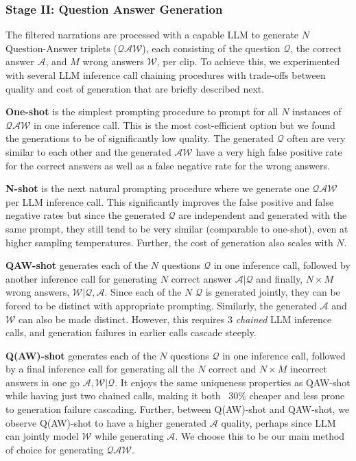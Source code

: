 \subsubsection{Stage II: Question Answer Generation}
\label{sec:stage2}
The filtered narrations are processed with a capable LLM to generate $N$ Question-Answer triplets ($\mathcal{QAW}$), each consisting of the question $\mathcal{Q}$, the correct answer $\mathcal{A}$, and $M$ wrong answers $\mathcal{W}$, per clip. To achieve this, we experimented with several LLM inference call chaining procedures with trade-offs between quality and cost of generation that are briefly described next. 

\noindent \textbf{One-shot} is the simplest prompting procedure to prompt for all $N$ instances of $\mathcal{QAW}$ in one inference call. This is the most cost-efficient option but we found the generations to be of significantly low quality. The generated $\mathcal{Q}$ often are very similar to each other and the generated $\mathcal{AW}$ have a very high false positive rate for the correct answers as well as a false negative rate for the wrong answers.

\noindent \textbf{N-shot} is the next natural prompting procedure where we generate one $\mathcal{QAW}$ per LLM inference call. This significantly improves the false positive and false negative rates but since the generated $\mathcal{Q}$ are independent and generated with the same prompt, they still tend to be very similar (comparable to one-shot), even at higher sampling temperatures. Further, the cost of generation also scales with $N$. 

\noindent \textbf{QAW-shot} generates each of the $N$ questions $\mathcal{Q}$ in one inference call, followed by another inference call for generating $N$ correct answer $\mathcal{A} | \mathcal{Q}$ and finally, $N \times M$ wrong answers, $\mathcal{W} | \mathcal{Q, A}$. Since each of the $N$ $\mathcal{Q}$ is generated jointly, they can be forced to be distinct with appropriate prompting. Similarly, the generated $\mathcal{A}$ and $\mathcal{W}$ can also be made distinct. However, this requires 3 \textit{chained} LLM inference calls, and generation failures in earlier calls cascade steeply. 

\noindent \textbf{Q(AW)-shot} generates each of the $N$ questions $\mathcal{Q}$ in one inference call, followed by a final inference call for generating all the $N$ correct and $N \times M$ incorrect answers in one go $\mathcal{A, W} | \mathcal{Q}$. It enjoys the same uniqueness properties as QAW-shot while having just two chained calls, making it both ~$30\%$ cheaper and less prone to generation failure cascading. Further, between Q(AW)-shot and QAW-shot, we observe Q(AW)-shot to have a higher generated $\mathcal{A}$ quality, perhaps since LLM can jointly model $\mathcal{W}$ while generating $\mathcal{A}$. We choose this to be our main method of choice for generating $\mathcal{QAW}$. 

